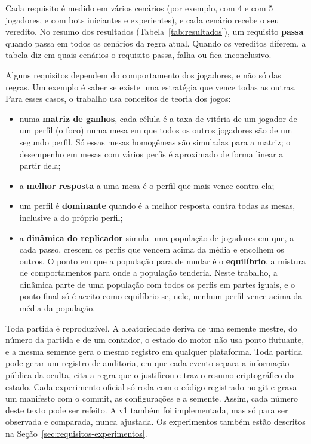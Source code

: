 Cada requisito é medido em vários cenários (por exemplo, com 4 e com 5 jogadores, e com bots iniciantes
e experientes), e cada cenário recebe o seu veredito. No resumo dos resultados (Tabela~\ref{tab:resultados}), um
requisito \textbf{passa} quando passa em todos os cenários da regra atual. Quando os vereditos diferem, a tabela
diz em quais cenários o requisito passa, falha ou fica inconclusivo.

Alguns requisitos dependem do comportamento dos jogadores, e não só das regras. Um exemplo é saber se existe
uma estratégia que vence todas as outras. Para esses casos, o trabalho usa conceitos de teoria dos jogos:
\begin{itemize}
  \item numa \textbf{matriz de ganhos}, cada célula é a taxa de vitória de um jogador de um perfil (o foco) numa
    mesa em que todos os outros jogadores são de um segundo perfil. Só essas mesas homogêneas são
    simuladas para a matriz; o desempenho em mesas com vários perfis é aproximado de forma linear a partir
    dela;
  \item a \textbf{melhor resposta} a uma mesa é o perfil que mais vence contra ela;
  \item um perfil é \textbf{dominante} quando é a melhor resposta contra todas as mesas, inclusive a do próprio
    perfil;
  \item a \textbf{dinâmica do replicador} \cite{taylor1978} simula uma população de jogadores em que, a cada
    passo, crescem os perfis que vencem acima da média e encolhem os outros. O ponto em que a população para de
    mudar é o \textbf{equilíbrio}, a mistura de comportamentos para onde a população tenderia. Neste
    trabalho, a dinâmica parte de uma população com todos os perfis em partes iguais, e o ponto final só é aceito
    como equilíbrio se, nele, nenhum perfil vence acima da média da população.
\end{itemize}

Toda partida é reproduzível. A aleatoriedade deriva de uma semente mestre, do número da partida e de um
contador, o estado do motor não usa ponto flutuante, e a mesma semente gera o mesmo registro em qualquer
plataforma. Toda partida pode gerar um registro de auditoria, em que cada evento separa a informação pública da
oculta, cita a regra que o justificou e traz o resumo criptográfico do estado. Cada experimento oficial só roda
com o código registrado no git e grava um manifesto com o commit, as configurações e a semente. Assim, cada
número deste texto pode ser refeito. A v1 também foi implementada, mas só para ser observada e comparada, nunca
ajustada. Os experimentos também estão descritos na Seção~\ref{sec:requisitos-experimentos}.

